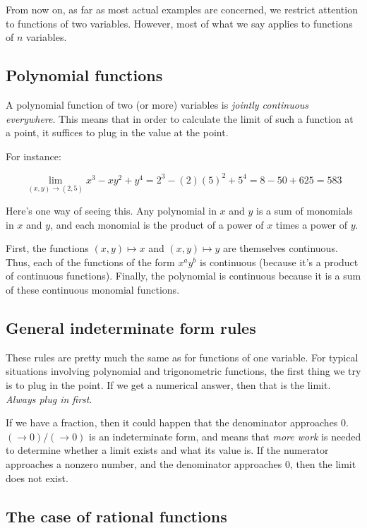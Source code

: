 \documentclass[10pt]{amsart}
\begin{document}
From now on, as far as most actual examples are concerned, we restrict
attention to functions of two variables. However, most of what we say
applies to functions of $n$ variables.

\subsection{Polynomial functions}

A polynomial function of two (or more) variables is {\em jointly
continuous everywhere}. This means that in order to calculate the
limit of such a function at a point, it suffices to plug in the value
at the point.

For instance:

$$\lim_{(x,y) \to (2,5)} x^3 - xy^2 + y^4 = 2^3 - (2)(5)^2 + 5^4 = 8 - 50 + 625 = 583$$

Here's one way of seeing this. Any polynomial in $x$ and $y$ is a sum
of monomials in $x$ and $y$, and each monomial is the product of a
power of $x$ times a power of $y$.

First, the functions $(x,y) \mapsto x$ and $(x,y) \mapsto y$ are
themselves continuous. Thus, each of the functions of the form
$x^ay^b$ is continuous (because it's a product of continuous
functions). Finally, the polynomial is continuous because it is a sum
of these continuous monomial functions.

\subsection{General indeterminate form rules}

These rules are pretty much the same as for functions of one
variable. For typical situations involving polynomial and
trigonometric functions, the first thing we try is to plug in the
point. If we get a numerical answer, then that is the limit. {\em
Always plug in first}.

If we have a fraction, then it could happen that the denominator
approaches $0$. $(\to 0)/(\to 0)$ is an indeterminate form, and means
that {\em more work} is needed to determine whether a limit exists and
what its value is. If the numerator approaches a nonzero number, and
the denominator approaches $0$, then the limit does not exist.

\subsection{The case of rational functions}
\end{document}
